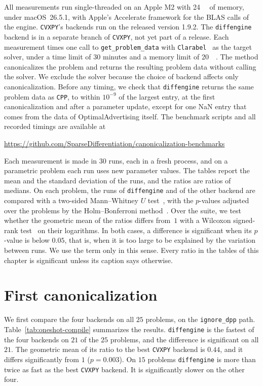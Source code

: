 All measurements run single-threaded on an Apple M2 with \SI{24}{\giga\byte} of memory,
under macOS~26.5.1, with Apple's Accelerate framework for the \ac{BLAS} calls of the engine.
\texttt{CVXPY}'s backends run on the released
version 1.9.2. The \texttt{diffengine} backend is in a separate branch of \texttt{CVXPY},
not yet part of a release.
Each measurement times one call to \texttt{get\_problem\_data} with
\texttt{Clarabel}~\cite{clarabel} as the target solver, under a time limit of 30
minutes and a memory limit of \SI{20}{\giga\byte}. The method canonicalizes the
problem and returns the resulting problem data without calling the solver. We exclude the
solver because the choice of backend affects only canonicalization.
Before any timing, we check that \texttt{diffengine} returns the same problem data as
\texttt{CPP}, to within $10^{-9}$ of the largest entry, at the first canonicalization and after a parameter update, except for
one NaN entry that comes from the data of OptimalAdvertising itself.
The benchmark scripts and all recorded timings are available at
\begin{center}
  \url{https://github.com/SparseDifferentiation/canonicalization-benchmarks}
\end{center}

Each measurement is made in $30$ runs, each in a fresh process, and on a parametric problem
each run uses new parameter values. The tables report the mean and the standard deviation of
the runs, and the ratios are ratios of medians. On each problem, the runs of
\texttt{diffengine} and of the other backend are compared with a two-sided Mann--Whitney $U$
test~\cite{mann1947}, with the $p$-values adjusted over the problems by the Holm--Bonferroni
method~\cite{holm1979}. Over the suite, we test whether the geometric mean of the ratios
differs from~$1$ with a Wilcoxon signed-rank test~\cite{wilcoxon1945} on their logarithms. In
both cases, a difference is significant when its $p$-value is below $0.05$, that is, when it is too
large to be explained by the variation between runs. We use the term only in this sense.
Every ratio in the tables of this chapter is significant unless its caption says otherwise.

\section{First canonicalization}
\label{sec:bench-oneshot}

We first compare the four backends on all $25$ problems, on the \texttt{ignore\_dpp} path.
Table~\ref{tab:oneshot-compile} summarizes the results. \texttt{diffengine} is the
fastest of the four backends on $21$ of the $25$ problems, and the difference is
significant on all $21$. The geometric mean of its ratio to the best \texttt{CVXPY}
backend is $0.44$, and it differs significantly from $1$ ($p = 0.003$). On $15$ problems \texttt{diffengine} is more
than twice as fast as the best \texttt{CVXPY} backend. It is significantly slower on the other
four.

